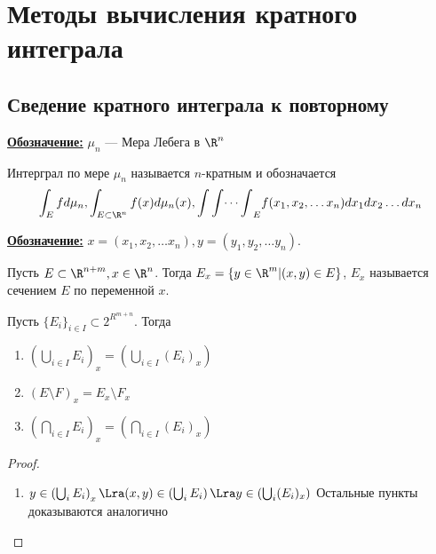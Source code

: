 
\section{Методы вычисления кратного интеграла}
\subsection{Сведение кратного интеграла к повторному}

\underline{\textbf{Обозначение:}} \(\mu_n\) --- Мера Лебега в \(\R^n\)

\begin{definition}
    Интерграл по мере \(\mu_n\) называется \(n\)-кратным и обозначается
    \[\int_E fd\mu_n, \int_{E\subset \R^n} f(x)d\mu_n(x), {\int\int\dots\int}_E f(x_1, x_2, \dots x_n) dx_1dx_2\dots dx_n\]
\end{definition}

\underline{\textbf{Обозначение:}} \(x = (x_1, x_2, \dots x_n), y = (y_1, y_2, \dots y_n)\).

\begin{definition}
    Пусть \(E \subset \R^{n + m}, x \in \R^n\). Тогда \(E_x = \{y \in \R^m | (x, y) \in E\}\), \(E_x\) называется сечением \(E\) по переменной \(x\).
\end{definition}

\begin{proposition}
    Пусть \(\{E_i\}_{i \in I}\subset 2^{R^{m + n}}\). Тогда 
    \begin{enumerate}
        \item \(\left(\bigcup_{i \in I} E_i\right)_x = \left(\bigcup_{i \in I} (E_i)_x\right)\)
        \item \((E \setminus F)_x = E_x \setminus F_x\)
        \item \(\left(\bigcap_{i \in I} E_i\right)_x = \left(\bigcap_{i \in I} (E_i)_x\right)\)
    \end{enumerate}
\end{proposition}
\begin{proof}
    \begin{enumerate}
        \item \(y \in \left(\bigcup_i E_i\right)_x \Lra (x, y) \in \left(\bigcup_i E_i\right) \Lra y \in (\bigcup_i (E_i)_x)\)
        Остальные пункты доказываются аналогично
    \end{enumerate}
\end{proof}

